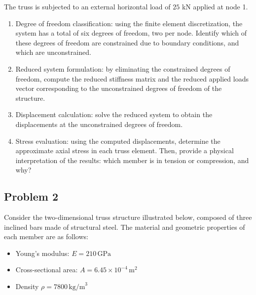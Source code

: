 \documentclass[12pt]{article}
\begin{document}
The truss is subjected to an external horizontal load of $25$ kN applied at node 1.
\begin{enumerate}
    \item[a)] Degree of freedom classification: using the finite element discretization, the system has a total of six degrees of freedom, two per node. Identify which of these degrees of freedom are constrained due to boundary conditions, and which are unconstrained.
    \item[b)] Reduced system formulation: by eliminating the constrained degrees of freedom, compute the reduced stiffness matrix and the reduced applied loads vector corresponding to the unconstrained degrees of freedom of the structure.
    \item[c)] Displacement calculation: solve the reduced system to obtain the displacements at the unconstrained degrees of freedom.
    \item[d)] Stress evaluation: using the computed displacements, determine the approximate axial stress in each truss element. Then, provide a physical interpretation of the results: which member is in tension or compression, and why?
\end{enumerate}

\newpage
\subsection*{Problem 2}
Consider the two-dimensional truss structure illustrated below, composed of three inclined bars made of structural steel. The material and geometric properties of each member are as follows:
\begin{itemize}
    \item Young’s modulus: $E = 210 \, \text{GPa}$
    \item Cross-sectional area: $A = 6.45 \times 10^{-4} \, \text{m}^2$
    \item Density $\rho = 7800 \, \text{kg/m}^3$
\end{itemize}
\end{document}
